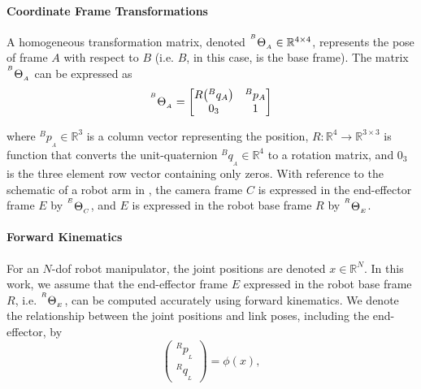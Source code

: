 \paragraph{Coordinate Frame Transformations} A homogeneous transformation matrix, denoted ${}^{^B}\Theta_{_A}\in\mathbb{R}^{4 \times 4}$, represents the pose of frame $A$ with respect to $B$ (i.e. $B$, in this case, is the base frame).
The matrix ${}^{^B}\Theta_{_A}$ can be expressed as
\begin{equation}
{}^{^B}\Theta_{_A} = 
    \begin{bmatrix}
     R\big({}^{B}q_A\big) & {}^{B}p_A \\
     0_3 & 1
    \end{bmatrix}
    \label{c1:eq:ht}
\end{equation}

where ${}^{B}p_{_A}\in\mathbb{R}^3$ is a column vector representing the position, $R:\mathbb{R}^4\rightarrow\mathbb{R}^{3\times 3}$ is function that converts the unit-quaternion ${}^{B}q_{_A}\in\mathbb{R}^4$ to a rotation matrix, and $0_3$ is the three element row vector containing only zeros.
With reference to the schematic of a robot arm in , the camera frame $C$ is expressed in the end-effector frame $E$ by ${}^{^E}\Theta_{_C}$, and $E$ is expressed in the robot base frame $R$ by ${}^{^R}\Theta_{_E}$. 

\paragraph{Forward Kinematics} For an $N$-\acrshort{dof} robot manipulator, the joint positions are denoted $x\in\mathbb{R}^N$. In this work, we assume that the end-effector frame $E$ expressed in the robot base frame $R$, i.e. ${}^{^R}\Theta_{_E}$, can be computed accurately using forward kinematics. We denote the relationship between the joint positions and link poses, including the end-effector, by
\begin{equation}
    \begin{pmatrix}
         {}^{R}p_{_L}\\
         {}^{R}q_{_L}
    \end{pmatrix}
    = \phi(x),
    \label{c1:eq:fk}
\end{equation}

